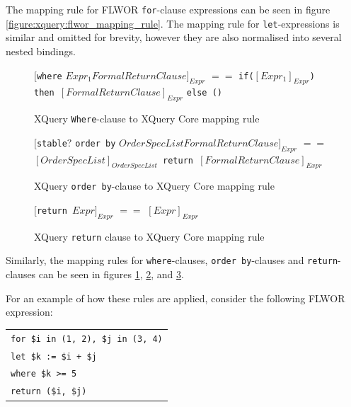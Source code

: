 The mapping rule for FLWOR \texttt{for}-clause expressions can be seen in figure
\ref{figure:xquery:flwor_mapping_rule}. The mapping rule for \texttt{let}-expressions is
similar and omitted for brevity, however they are also normalised into several nested bindings.

\begin{figure}[!h]
\centering
$[$\texttt{where} $Expr_1 FormalReturnClause]_{Expr}$ \newline
$==$ \newline
\texttt{if(}$[Expr_1]_{Expr}$\texttt{) then }$[FormalReturnClause]_{Expr}$ \texttt{else ()}
  \caption{XQuery \texttt{Where}-clause to XQuery Core mapping rule}
  \label{figure:xquery:where_mapping_rule}
\end{figure}

\begin{figure}[!h]
\centering
$[$\texttt{stable}$?$ \texttt{order by} $OrderSpecList FormalReturnClause]_{Expr}$ \newline
$==$ \newline
$[OrderSpecList]_{OrderSpecList}$\texttt{ return }$[FormalReturnClause]_{Expr}$
  \caption{XQuery \texttt{order by}-clause to XQuery Core mapping rule}
  \label{figure:xquery:orderby_mapping_rule}
\end{figure}

\begin{figure}[!h]
\centering
$[$\texttt{return }$Expr]_{Expr}$ \newline
$==$ \newline
$[Expr]_{Expr}$
  \caption{XQuery \texttt{return} clause to XQuery Core mapping rule}
  \label{figure:xquery:return_mapping_rule}
\end{figure}

Similarly, the mapping rules for \texttt{where}-clauses, \texttt{order by}-clauses and
\texttt{return}-clauses can be seen in figures \ref{figure:xquery:where_mapping_rule},
\ref{figure:xquery:orderby_mapping_rule},
and \ref{figure:xquery:return_mapping_rule}.

For an example of how these rules are applied, consider the following FLWOR
expression:
%
\begin{center}
\begin{tabular}{l}
\texttt{for \$i in (1, 2), \$j in (3, 4)} \\
  \texttt{let \$k := \$i + \$j} \\
  \texttt{where \$k >= 5} \\
   \texttt{return (\$i, \$j)} \\
\end{tabular}
\end{center}

